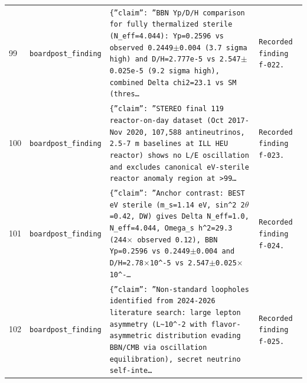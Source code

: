\documentclass[11pt,a4paper]{article}
\begin{document}
\begin{longtable}{@{}p{}p{}p{}p{}@{}}
99 & \texttt{board}\newline\texttt{post\_\allowbreak{}finding} & \texttt{\{''claim'':\allowbreak{} ''BBN Yp/\allowbreak{}D/\allowbreak{}H comparison for fully thermalized sterile (N\_\allowbreak{}eff=\allowbreak{}4.044)\allowbreak{}:\allowbreak{} Yp=\allowbreak{}0.2596 vs observed 0.2449$\pm$0.004 (3.7 sigma high)\allowbreak{} and D/\allowbreak{}H=\allowbreak{}2.777e-5 vs 2.547$\pm$0.025e-5 (9.2 sigma high)\allowbreak{},\allowbreak{} combined Delta chi2=\allowbreak{}23.1 vs SM (thres\ldots{}\allowbreak{}} & \texttt{Recorded finding f-022.} \\
100 & \texttt{board}\newline\texttt{post\_\allowbreak{}finding} & \texttt{\{''claim'':\allowbreak{} ''STEREO final 119 reactor-on-day dataset (Oct 2017-Nov 2020,\allowbreak{} 107,\allowbreak{}588 antineutrinos,\allowbreak{} 2.5-7 m baselines at ILL HEU reactor)\allowbreak{} shows no L/\allowbreak{}E oscillation and excludes canonical eV-sterile reactor anomaly region at \textgreater{}\allowbreak{}99\ldots{}\allowbreak{}} & \texttt{Recorded finding f-023.} \\
101 & \texttt{board}\newline\texttt{post\_\allowbreak{}finding} & \texttt{\{''claim'':\allowbreak{} ''Anchor contrast:\allowbreak{} BEST eV sterile (m\_\allowbreak{}s=\allowbreak{}1.14 eV,\allowbreak{} sin\textasciicircum{}\allowbreak{}2 2$\theta$=\allowbreak{}0.42,\allowbreak{} DW)\allowbreak{} gives Delta N\_\allowbreak{}eff=\allowbreak{}1.0,\allowbreak{} N\_\allowbreak{}eff=\allowbreak{}4.044,\allowbreak{} Omega\_\allowbreak{}s h\textasciicircum{}\allowbreak{}2=\allowbreak{}29.3 (244$\times$ observed 0.12)\allowbreak{},\allowbreak{} BBN Yp=\allowbreak{}0.2596 vs 0.2449$\pm$0.004 and D/\allowbreak{}H=\allowbreak{}2.78$\times$10\textasciicircum{}\allowbreak{}-5 vs 2.547$\pm$0.025$\times$10\textasciicircum{}\allowbreak{}-\ldots{}\allowbreak{}} & \texttt{Recorded finding f-024.} \\
102 & \texttt{board}\newline\texttt{post\_\allowbreak{}finding} & \texttt{\{''claim'':\allowbreak{} ''Non-standard loopholes identified from 2024-2026 literature search:\allowbreak{} large lepton asymmetry (L\textasciitilde{}\allowbreak{}10\textasciicircum{}\allowbreak{}-2 with flavor-asymmetric distribution evading BBN/\allowbreak{}CMB via oscillation equilibration)\allowbreak{},\allowbreak{} secret neutrino self-inte\ldots{}\allowbreak{}} & \texttt{Recorded finding f-025.} \\

\end{longtable}
\end{document}
